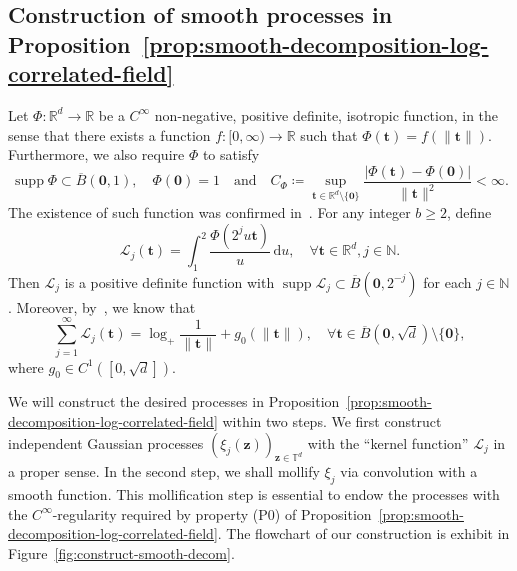 \documentclass[12pt]{amsart}
\theoremstyle{definition}
\theoremstyle{remark}
\newcommand{\bt}{\boldsymbol{t}}
\newcommand{\bz}{\boldsymbol{z}}
\newcommand{\R}{\mathbb{R}}
\newcommand{\N}{\mathbb{N}}
\newcommand{\T}{\mathbb{T}}
\newcommand{\supp}{\operatorname{supp}}
\newcommand{\anand}{\quad\text{and}\quad}
\numberwithin{equation}{section}
\begin{document}
\subsection{Construction of smooth processes in Proposition~\ref{prop:smooth-decomposition-log-correlated-field}}\label{ssec:construc-smooth-decom}
Let $\Phi\colon \R^d\to \R$ be a $C^\infty$ non-negative, positive definite, isotropic function, in the sense that there exists a function $f:[0,\infty)\to \R$ such that $\Phi(\bt)=f(\|\bt\|)$. Furthermore, we also require $\Phi$ to satisfy
\begin{equation}\label{eq:properties-Phi}
\supp \Phi\subset \overline{B}(\boldsymbol{0},1),\quad \Phi(\boldsymbol{0})=1 \anand C_\Phi\coloneq\sup_{\bt\in \R^d\setminus \{\boldsymbol{0}\}} \frac{|\Phi(\bt) - \Phi(\boldsymbol{0})|}{\|\bt\|^{2}}<\infty.
\end{equation}
The existence of such function was confirmed in~\cite[Lemma~3.9]{LQT25}. For any integer $b\ge 2$, define
\begin{equation}\label{eq:j-kernel-Rd}
\mathcal{L}_j(\bt)=\int_1^2 \frac{\Phi(2^j u\bt)}{u}\,\mathrm{d}u,\quad \forall \bt\in \R^d, j\in \N.
\end{equation}
Then $\mathcal{L}_j$ is a positive definite function with $\supp \mathcal{L}_j\subset \overline{B}(\boldsymbol{0},2^{-j})$ for each $j\in \N$. Moreover, by~\cite[Proposition~3.8]{LQT25}, we know that
\begin{equation}\label{eq:property-Lj}
\sum_{j=1}^\infty \mathcal{L}_j(\bt)=\log_+\frac{1}{\|\bt\|}+g_0(\|\bt\|),\quad \forall \bt\in \overline{B}(\boldsymbol{0},\sqrt{d})\setminus\{\boldsymbol{0}\},
\end{equation}
where $g_0\in C^1([0,\sqrt{d}])$. 

We will construct the desired processes in Proposition~\ref{prop:smooth-decomposition-log-correlated-field} within two steps. We first construct independent Gaussian processes $(\xi_j(\bz))_{\bz\in \T^d}$ with the ``kernel function'' $\mathcal{L}_j$ in a proper sense. In the second step, we shall  mollify $\xi_j$ via convolution with a smooth function. 
This mollification step is essential to endow the processes with the $C^\infty$-regularity required by property (P0) of Proposition~\ref{prop:smooth-decomposition-log-correlated-field}. The flowchart of our construction is exhibit in Figure~\ref{fig:construct-smooth-decom}.
\end{document}
